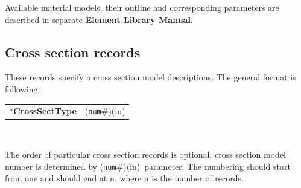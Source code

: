 \documentclass[a4paper]{article}
\makeatletter
\newcommand{\param}[1]{\texttt{#1}} %
\newcommand{\componentNum}{(\param{num}\#){\tiny(in)}} %
\newcommand{\entKeyword}[1]{*\textbf{#1}} %
\newenvironment{record}[1][]{\begin{tabular}{|ll}}{\end{tabular}\\}
\newcommand{\recentry}[2]{{#1}&{#2}\\}
\newcounter{rcc}
\newenvironment{record}[1][\textwidth]{\setcounter{rcc}{0}\begin{tabular*}{#1}{|ll@{\extracolsep{\fill}}r}}{\end{tabular*}\\}
\newcommand{\recentry}[2]{\ifthenelse{\value{rcc}>0}{&$\backslash$ \\}{\setcounter{rcc}{1}}{#1}&{#2}}
\makeatother
\begin{document}
Available material models, their outline and
corresponding parameters are described in separate \textbf{Element Library Manual.}

\subsection{Cross section records}
\label{_CrossSectionRecords}
These records specify a cross section model descriptions. The general format is
following:

\begin{record}[0.9\textwidth]
  \recentry{\entKeyword{CrossSectType}}{\componentNum}
\end{record}

The order of particular cross section records is optional, cross section model number is determined by \componentNum\ parameter.
The numbering should start from one and should end at n, where n is the number of records.
\end{document}
